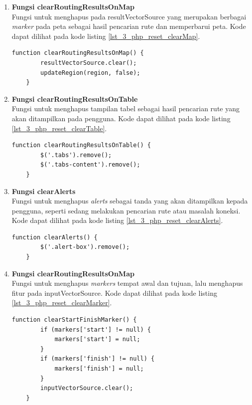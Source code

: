 \begin{enumerate}
	\item \textbf{Fungsi clearRoutingResultsOnMap}\\
	Fungsi untuk menghapus pada resultVectorSource yang merupakan berbagai \textit{marker} pada peta sebagai hasil pencarian rute dan memperbarui peta. Kode dapat dilihat pada kode listing \ref{lst_3_php_reset_clearMap}.
	\begin{lstlisting}[caption=Fungsi JavaScript untuk menghapus hasil pencarian rute pada peta ,label = {lst_3_php_reset_clearMap}]
	function clearRoutingResultsOnMap() {
		resultVectorSource.clear();
		updateRegion(region, false);
	}
	\end{lstlisting}
	
	\item \textbf{Fungsi clearRoutingResultsOnTable}\\
	Fungsi untuk menghapus tampilan tabel sebagai hasil pencarian rute yang akan ditampilkan pada pengguna. Kode dapat dilihat pada kode listing \ref{lst_3_php_reset_clearTable}.
	
	\begin{lstlisting}[caption=Fungsi JavaScript untuk menghapus tampilan tabel,label = {lst_3_php_reset_clearTable}]
	function clearRoutingResultsOnTable() {
		$('.tabs').remove();
		$('.tabs-content').remove();
	}
	\end{lstlisting}
	
	\item \textbf{Fungsi clearAlerts}\\
	Fungsi untuk menghapus \textit{alerts} sebagai tanda yang akan ditampilkan kepada pengguna, seperti sedang melakukan pencarian rute atau masalah koneksi. Kode dapat dilihat pada kode listing \ref{lst_3_php_reset_clearAlerts}.
	
	\begin{lstlisting}[caption=Fungsi JavaScript untuk menghilangkan \textit{alerts},label = {lst_3_php_reset_clearAlerts}]
	function clearAlerts() {
		$('.alert-box').remove();
	}
	\end{lstlisting}
	
	\item \textbf{Fungsi clearRoutingResultsOnMap}\\
	Fungsi untuk menghapus \textit{markers} tempat awal dan tujuan, lalu menghapus fitur pada inputVectorSource. Kode dapat dilihat pada kode listing \ref{lst_3_php_reset_clearMarker}.
	
	\begin{lstlisting}[caption=Fungsi JavaScript untuk menghilangkan \textit{alerts},label = {lst_3_php_reset_clearMarker}]
	function clearStartFinishMarker() {
		if (markers['start'] != null) {
			markers['start'] = null;
		}
		if (markers['finish'] != null) {
			markers['finish'] = null;
		}
		inputVectorSource.clear();
	}
	\end{lstlisting}
	
\end{enumerate}

